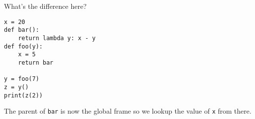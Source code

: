 \begin{blocksection}
\question What's the difference here?

\begin{lstlisting}
x = 20
def bar():
    return lambda y: x - y
def foo(y):
    x = 5
    return bar

y = foo(7)
z = y()
print(z(2))
\end{lstlisting}

\begin{solution}[0.5in]
The parent of \lstinline$bar$ is now the global frame so we lookup the value of \lstinline$x$ from there.
\end{solution}
\end{blocksection}
